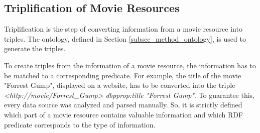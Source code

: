 \subsection{Triplification of Movie Resources}
\label{subsec_method_triplification}

Triplification is the step of converting information from a movie resource into triples.
The ontology, defined in Section \ref{subsec_method_ontology}, is used to generate the triples.

To create triples from the information of a movie resource, the information has to be matched to a corresponding predicate.
For example, the title of the movie "Forrest Gump", displayed on a website, has to be converted into the triple \emph{<http://movie/Forrest\_Gump> dbpprop:title "Forrest Gump"}.
To guarantee this, every data source was analyzed and parsed manually.
So, it is strictly defined which part of a movie resource contains valuable information and which RDF predicate corresponds to the type of information.